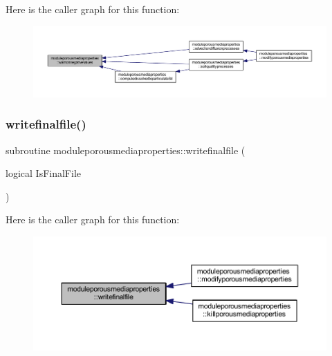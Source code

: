 Here is the caller graph for this function\+:\nopagebreak
\begin{figure}[H]
\begin{center}
\leavevmode
\includegraphics[width=350pt]{namespacemoduleporousmediaproperties_a457fa586000763f38ce30bbaf81de100_icgraph}
\end{center}
\end{figure}
\mbox{\label{namespacemoduleporousmediaproperties_aed2bfb3c9121c8c37fc6bcd2ac8e1eb0}} 
\subsubsection{\texorpdfstring{writefinalfile()}{writefinalfile()}}
{\footnotesize\ttfamily subroutine moduleporousmediaproperties\+::writefinalfile (\begin{DoxyParamCaption}\item[{logical}]{Is\+Final\+File }\end{DoxyParamCaption})\hspace{0.3cm}{\ttfamily [private]}}

Here is the caller graph for this function\+:\nopagebreak
\begin{figure}[H]
\begin{center}
\leavevmode
\includegraphics[width=350pt]{namespacemoduleporousmediaproperties_aed2bfb3c9121c8c37fc6bcd2ac8e1eb0_icgraph}
\end{center}
\end{figure}


